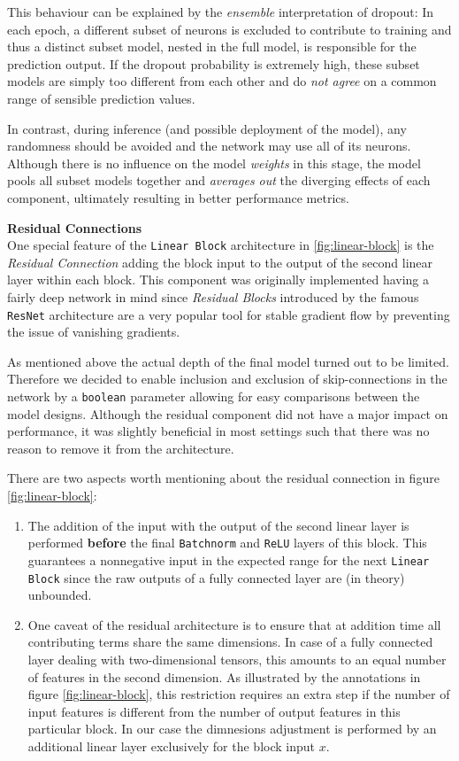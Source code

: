 \documentclass[12pt, letterpaper]{article}
\begin{document}
This behaviour can be explained by the \emph{ensemble} interpretation of dropout:
In each epoch, a different subset of neurons is excluded to contribute to training and thus a distinct subset model, nested in the full model, is responsible for the prediction output.
If the dropout probability is extremely high, these subset models are simply too different from each other and do \emph{not agree} on a common range of sensible prediction values.

In contrast, during inference (and possible deployment of the model), any randomness should be avoided and the network may use all of its neurons.
Although there is no influence on the model \emph{weights} in this stage, the model pools all subset models together and \emph{averages out} the diverging effects of each component, ultimately resulting in better performance metrics.

\textbf{Residual Connections} \\
One special feature of the \texttt{Linear Block} architecture in \ref{fig:linear-block} is the \emph{Residual Connection} adding the block input to the output of the second linear layer within each block.
This component was originally implemented having a fairly deep network in mind since \emph{Residual Blocks} introduced by the famous \texttt{ResNet} architecture are a very popular tool for stable gradient flow by preventing the issue of vanishing gradients.

As mentioned above the actual depth of the final model turned out to be limited.
Therefore we decided to enable inclusion and exclusion of skip-connections in the network by a \texttt{boolean} parameter allowing for easy comparisons between the model designs.
Although the residual component did not have a major impact on performance, it was slightly beneficial in most settings such that there was no reason to remove it from the architecture.

There are two aspects worth mentioning about the residual connection in figure \ref{fig:linear-block}:
\begin{enumerate}
    \item The addition of the input with the output of the second linear layer is performed \textbf{before} the final \texttt{Batchnorm} and \texttt{ReLU} layers of this block.
          This guarantees a nonnegative input in the expected range for the next \texttt{Linear Block} since the raw outputs of a fully connected layer are (in theory) unbounded.

    \item One caveat of the residual architecture is to ensure that at addition time all contributing terms share the same dimensions.
          In case of a fully connected layer dealing with two-dimensional tensors, this amounts to an equal number of features in the second dimension.
          As illustrated by the annotations in figure \ref{fig:linear-block}, this restriction requires an extra step if the number of input features is different from the number of output features in this particular block.
          In our case the dimnesions adjustment is performed by an additional linear layer exclusively for the block input $x$.
\end{enumerate}
\end{document}
